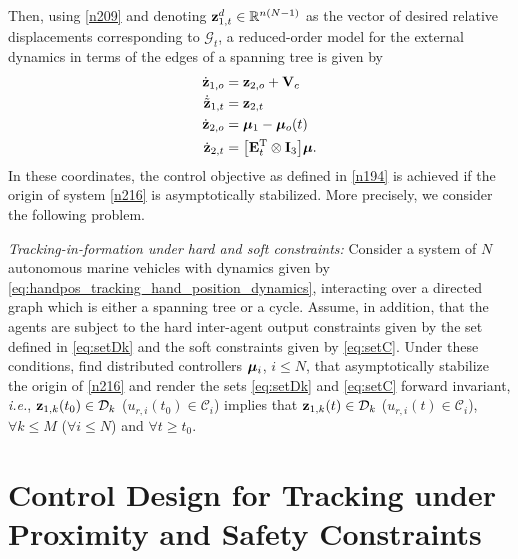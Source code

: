 Then, using \eqref{n209} and denoting $\mathbf{z}_{1, t}^d\in\mathbb{R}^{n(N-1)}$ as the vector of desired relative displacements corresponding to $\mathcal G_t$, a reduced-order model for the external dynamics in terms of the edges of a spanning tree is given by
\begin{subequations}\allowdisplaybreaks\label{n216}\begin{align}
	\dot{\mat{z}}_{1, o}&=\mat{z}_{2, o}+\ocean\label{n217-t}\\
	\dot{\tilde{\mat{z}}}_{1, t} &=\mat{z}_{2, t}\label{n217}\\
	\dot{\mat{z}}_{2, o}&=\bs{\mu}_1-\bs{\mu}_o(t)\label{n218-t}\\
	\dot{\mat{z}}_{2, t}&=\big[\mat{E}_t\T\otimes \mat{I}_3\big]\bs{\mu}.\label{n218}
	\end{align}\end{subequations}
In these coordinates, the control objective as defined in \eqref{n194} is achieved if the origin of system \eqref{n216} is asymptotically stabilized.
More precisely, we consider the following problem. 

{\it Tracking-in-formation under hard and soft constraints:} Consider a system of $N$ autonomous marine vehicles with dynamics given by \eqref{eq:handpos_tracking_hand_position_dynamics}, interacting over a directed graph which is either a spanning tree or a cycle.
Assume, in addition, that the agents are subject to the hard inter-agent output constraints given by the set defined in \eqref{eq:setDk} and the soft constraints given by \eqref{eq:setC}.
Under these conditions, find distributed controllers $\bm{\mu}_i$, $i\leq N$, that asymptotically stabilize the origin of \eqref{n216} and render the sets \eqref{eq:setDk} and \eqref{eq:setC} forward invariant, \emph{i.e.}, $\mathbf{z}_{1, k}(t_0)\in\mathcal{D}_k$ ($u_{r, i}(t_0)\in\mathcal{C}_i$) implies that $\mathbf{z}_{1, k}(t)\in \mathcal{D}_k$ ($u_{r, i}(t)\in\mathcal{C}_i$), $\forall k\leq M$ ($\forall i\leq N$) and $\forall t\geq t_0$.

\section{Control Design for Tracking under Proximity and Safety Constraints}
\label{sec:ctrl}

